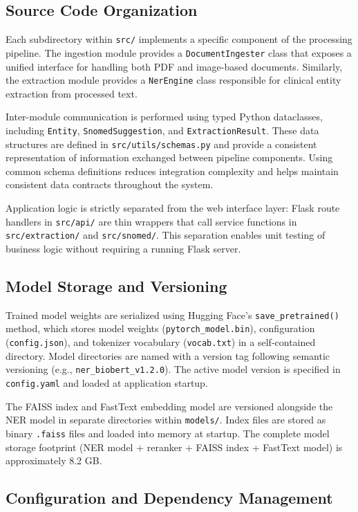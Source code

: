 \subsection{Source Code Organization}
Each subdirectory within \texttt{src/} implements a specific component of the processing pipeline. The ingestion module provides a \texttt{DocumentIngester} class that exposes a unified interface for handling both PDF and image-based documents. Similarly, the extraction module provides a \texttt{NerEngine} class responsible for clinical entity extraction from processed text.

Inter-module communication is performed using typed Python dataclasses, including \texttt{Entity}, \texttt{SnomedSuggestion}, and \texttt{ExtractionResult}. These data structures are defined in \texttt{src/utils/schemas.py} and provide a consistent representation of information exchanged between pipeline components. Using common schema definitions reduces integration complexity and helps maintain consistent data contracts throughout the system.

Application logic is strictly separated from the web interface layer: Flask route handlers in \texttt{src/api/} are thin wrappers that call service functions in \texttt{src/extraction/} and \texttt{src/snomed/}. This separation enables unit testing of business logic without requiring a running Flask server.

\subsection{Model Storage and Versioning}
Trained model weights are serialized using Hugging Face's \texttt{save\_pretrained()} method, which stores model weights (\texttt{pytorch\_model.bin}), configuration (\texttt{config.json}), and tokenizer vocabulary (\texttt{vocab.txt}) in a self-contained directory. Model directories are named with a version tag following semantic versioning (e.g., \texttt{ner\_biobert\_v1.2.0}). The active model version is specified in \texttt{config.yaml} and loaded at application startup.

The FAISS index and FastText embedding model are versioned alongside the NER model in separate directories within \texttt{models/}. Index files are stored as binary \texttt{.faiss} files and loaded into memory at startup. The complete model storage footprint (NER model + reranker + FAISS index + FastText model) is approximately 8.2 GB.

\subsection{Configuration and Dependency Management}

